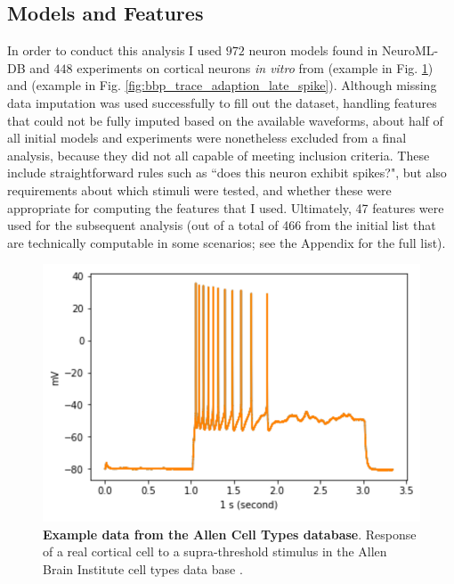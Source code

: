 


\subsection{Models and Features} 
In order to conduct this analysis I used $972$ neuron models found in NeuroML-DB \citep{neuroml-db} and $448$ experiments on cortical neurons \emph{in vitro} from \cite{gouwens2018systematic} (example in Fig. \ref{fig:adaptionm}) and \cite{markram2006blue} (example in Fig. \ref{fig:bbp_trace_adaption_late_spike}).
Although missing data imputation was used successfully to fill out the dataset, handling features that could not be fully imputed based on the available waveforms, about half of all initial models and experiments were nonetheless excluded from a final analysis, because they did not all capable of meeting inclusion criteria.
These include straightforward rules such as ``does this neuron exhibit spikes?", but also requirements about which stimuli were tested, and whether these were appropriate for computing the features that I used. 
Ultimately, 47 features were used for the subsequent analysis (out of a total of 466 from the initial list that are technically computable in some scenarios; see the Appendix for the full list).

\begin{figure}
    \begin{center}
    \includegraphics[width=0.6\linewidth]{figures/multi_spiking_large_allen}
    \caption[Example from Cell Types Database]{\textbf{Example data from the Allen Cell Types database}.
    Response of a real cortical cell to a supra-threshold stimulus in the Allen Brain Institute cell types data base \citep{gouwens2018systematic}.}
    \label{fig:adaptionm}
    \end{center}
\end{figure}    


